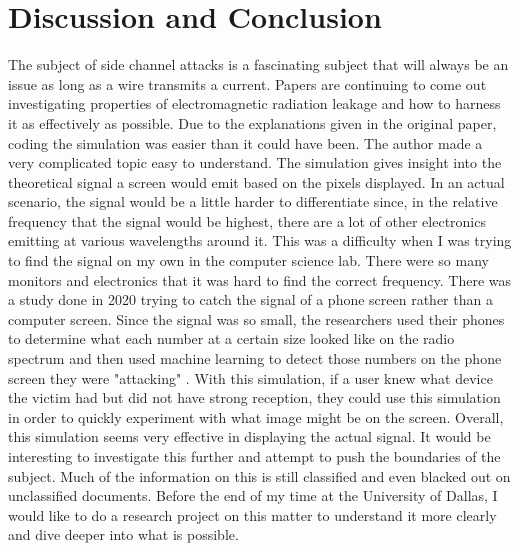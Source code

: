\documentclass{article}
\begin{document}
\section{Discussion and Conclusion}
\indent \indent The subject of side channel attacks is a fascinating subject that will always be an issue as long as a wire transmits a current. Papers are continuing to come out investigating properties of electromagnetic radiation leakage and how to harness it as effectively as possible. Due to the explanations given in the original paper, coding the simulation was easier than it could have been. The author made a very complicated topic easy to understand. The simulation gives insight into the theoretical signal a screen would emit based on the pixels displayed. In an actual scenario, the signal would be a little harder to differentiate since, in the relative frequency that the signal would be highest, there are a lot of other electronics emitting at various wavelengths around it. This was a difficulty when I was trying to find the signal on my own in the computer science lab. There were so many monitors and electronics that it was hard to find the correct frequency.  
\newline \indent There was a study done in 2020 trying to catch the signal of a phone screen rather than a computer screen. Since the signal was so small, the researchers used their phones to determine what each number at a certain size looked like on the radio spectrum and then used machine learning to detect those numbers on the phone screen they were "attacking" \cite{liu2020screen}. With this simulation, if a user knew what device the victim had but did not have strong reception, they could use this simulation in order to quickly experiment with what image might be on the screen. 
\newline \indent Overall, this simulation seems very effective in displaying the actual signal. It would be interesting to investigate this further and attempt to push the boundaries of the subject. Much of the information on this is still classified and even blacked out on unclassified documents. Before the end of my time at the University of Dallas, I would like to do a research project on this matter to understand it more clearly and dive deeper into what is possible. 


\newpage


\newpage
\end{document}
